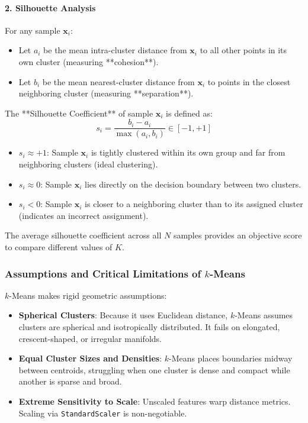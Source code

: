 \paragraph{2. Silhouette Analysis}
For any sample $\mathbf{x}_i$:
\begin{itemize}
    \item Let $a_i$ be the mean intra-cluster distance from $\mathbf{x}_i$ to all other points in its own cluster (measuring **cohesion**).
    \item Let $b_i$ be the mean nearest-cluster distance from $\mathbf{x}_i$ to points in the closest neighboring cluster (measuring **separation**).
\end{itemize}
The **Silhouette Coefficient** of sample $\mathbf{x}_i$ is defined as:
\begin{equation}
s_i = \frac{b_i - a_i}{\max(a_i, b_i)} \in [-1, +1]\label{eq:silhouette_coeff}
\end{equation}
\begin{itemize}
    \item $s_i \approx +1$: Sample $\mathbf{x}_i$ is tightly clustered within its own group and far from neighboring clusters (ideal clustering).
    \item $s_i \approx 0$: Sample $\mathbf{x}_i$ lies directly on the decision boundary between two clusters.
    \item $s_i < 0$: Sample $\mathbf{x}_i$ is closer to a neighboring cluster than to its assigned cluster (indicates an incorrect assignment).
\end{itemize}
The average silhouette coefficient across all $N$ samples provides an objective score to compare different values of $K$.

\subsubsection{Assumptions and Critical Limitations of $k$-Means}
$k$-Means makes rigid geometric assumptions:
\begin{itemize}
    \item \textbf{Spherical Clusters}: Because it uses Euclidean distance, $k$-Means assumes clusters are spherical and isotropically distributed. It fails on elongated, crescent-shaped, or irregular manifolds.
    \item \textbf{Equal Cluster Sizes and Densities}: $k$-Means places boundaries midway between centroids, struggling when one cluster is dense and compact while another is sparse and broad.
    \item \textbf{Extreme Sensitivity to Scale}: Unscaled features warp distance metrics. Scaling via \texttt{StandardScaler} is non-negotiable.
\end{itemize}

